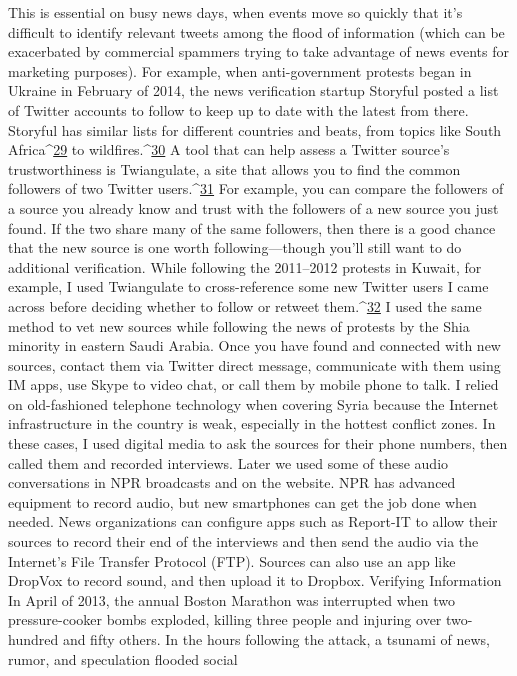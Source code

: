 This is essential on busy news days, when events move so quickly that it’s difficult to
identify relevant tweets among the flood of information (which can be exacerbated by
commercial spammers trying to take advantage of news events for marketing purposes).
For example, when anti-government protests began in Ukraine in February of 2014, the
news verification startup Storyful posted a list of Twitter accounts to follow to keep up to
date with the latest from there. Storyful has similar lists for different countries and beats,
from topics like South Africa^{\href{#endnotes}{29}} to wildfires.^{\href{#endnotes}{30}}
A tool that can help assess a Twitter source’s trustworthiness is Twiangulate, a site that
allows you to find the common followers of two Twitter users.^{\href{#endnotes}{31}} For example, you can
compare the followers of a source you already know and trust with the followers of a new
source you just found. If the two share many of the same followers, then there is a good
chance that the new source is one worth following—though you’ll still want to do
additional verification. While following the 2011–2012 protests in Kuwait, for example, I
used Twiangulate to cross-reference some new Twitter users I came across before
deciding whether to follow or retweet them.^{\href{#endnotes}{32}} I used the same method to vet new sources
while following the news of protests by the Shia minority in eastern Saudi Arabia.
Once you have found and connected with new sources, contact them via Twitter direct
message, communicate with them using IM apps, use Skype to video chat, or call them
by mobile phone to talk. I relied on old-fashioned telephone technology when covering
Syria because the Internet infrastructure in the country is weak, especially in the hottest
conflict zones. In these cases, I used digital media to ask the sources for their phone
numbers, then called them and recorded interviews. Later we used some of these audio
conversations in NPR broadcasts and on the website.
NPR has advanced equipment to record audio, but new smartphones can get the job done
when needed. News organizations can configure apps such as Report-IT to allow their
sources to record their end of the interviews and then send the audio via the Internet’s
File Transfer Protocol (FTP). Sources can also use an app like DropVox to record sound,
and then upload it to Dropbox.
Verifying Information
In April of 2013, the annual Boston Marathon was interrupted when two pressure-cooker
bombs exploded, killing three people and injuring over two-hundred and fifty others. In
the hours following the attack, a tsunami of news, rumor, and speculation flooded social
